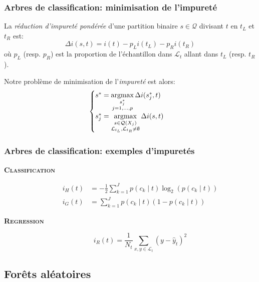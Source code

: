 \documentclass[dvipsnames,10pt]{beamer}
\theoremstyle{plain}
\theoremstyle{definition}
\begin{document}
\begin{frame}
\frametitle{Arbres de classification: minimisation de l'impureté}
\begin{definition}
    La \emph{réduction d'impureté pondérée} d'une partition binaire $s \in \mathcal{Q}$ divisant $t$ en $t_L$ et $t_R$ est:
    \begin{equation*}
        \Delta i(s,t) = i(t) - p_L i(t_L) - p_R i(t_R)
    \end{equation*}
    où $p_L$ (resp. $p_R$) est la proportion de l'échantillon dans $\mathcal{L}_t$ allant dans $t_L$ (resp. $t_R$).
\end{definition}
Notre problème de minimisation de l'\emph{impureté} est alors:
\begin{equation*}
\begin{cases}
    s^* = \operatornamewithlimits{argmax}\limits_{ \substack{s_j^* \\ j=1,\dotsc,p}} \Delta i(s^*_j,t) \\
    s^*_j = \operatornamewithlimits{argmax}\limits_{\substack{s \in \mathcal{Q}(X_j) \\ \mathcal{L}_{t_L},\mathcal{L}_{t_R} \neq \emptyset}} \Delta i(s,t)
\end{cases}
\end{equation*}
\end{frame}

\begin{frame}
\frametitle{Arbres de classification: exemples d'impuretés}
\begin{description}
    \item[\textbf{\textsc{Classification}}]
    \begin{align*}
        i_H (t) &= - \frac{1}{2} \sum_{k=1}^J p(c_k \mid t) \log_2 \left( p(c_k \mid t ) \right) \\
        i_G (t) &= \sum_{k=1}^J p\left(c_k \mid t \right) \left( 1-p(c_k \mid t) \right)
    \end{align*}
    \item[\textbf{\textsc{Regression}}]
    \begin{equation*}
        i_R (t) = \frac{1}{N_t} \sum_{x,y \in \mathcal{L}_t} (y-\hat{y}_t)^2
    \end{equation*}
\end{description}
\end{frame}

\subsection{Forêts aléatoires}
\end{document}
